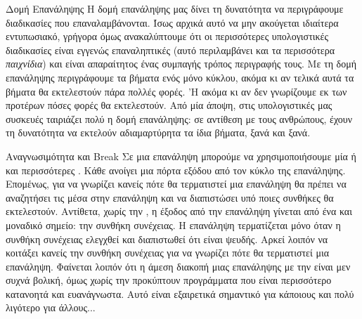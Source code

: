 \documentclass[a4paper,11pt,oneside]{book}
\begin{document}
\begin{theory}{Δομή Επανάληψης}
Η δομή επανάληψης μας δίνει τη δυνατότητα να περιγράφουμε διαδικασίες που επαναλαμβάνονται. Ίσως αρχικά αυτό να μην ακούγεται ιδιαίτερα εντυπωσιακό, γρήγορα όμως ανακαλύπτουμε ότι οι περισσότερες υπολογιστικές διαδικασίες είναι εγγενώς επαναληπτικές (αυτό περιλαμβάνει και τα περισσότερα \emph{παιχνίδια}) και είναι απαραίτητος ένας συμπαγής τρόπος περιγραφής τους. Με τη δομή επανάληψης περιγράφουμε τα βήματα ενός μόνο κύκλου, ακόμα κι αν τελικά αυτά τα βήματα θα εκτελεστούν πάρα πολλές φορές. 'Η ακόμα κι αν δεν γνωρίζουμε εκ των προτέρων πόσες φορές θα εκτελεστούν. Από μία άποψη, στις υπολογιστικές μας συσκευές ταιριάζει πολύ η δομή επανάληψης: σε αντίθεση με τους ανθρώπους, έχουν τη δυνατότητα να εκτελούν αδιαμαρτύρητα τα ίδια βήματα, ξανά και ξανά.
\end{theory}

\begin{theory}{Αναγνωσιμότητα και Break}
Σε μια επανάληψη μπορούμε να χρησιμοποιήσουμε μία ή και περισσότερες . Κάθε  ανοίγει μια πόρτα εξόδου από τον κύκλο της επανάληψης. Επομένως, για να γνωρίζει κανείς πότε θα τερματιστεί μια επανάληψη θα πρέπει να αναζητήσει τις  μέσα στην επανάληψη και να διαπιστώσει υπό ποιες συνθήκες θα εκτελεστούν. Αντίθετα, χωρίς την , η έξοδος από την επανάληψη γίνεται από ένα και μοναδικό σημείο: την συνθήκη συνέχειας. Η επανάληψη τερματίζεται μόνο όταν η συνθήκη συνέχειας ελεγχθεί και διαπιστωθεί ότι είναι ψευδής. Αρκεί λοιπόν να κοιτάξει κανείς την συνθήκη συνέχειας για να γνωρίζει πότε θα τερματιστεί μια επανάληψη. Φαίνεται λοιπόν ότι η άμεση διακοπή μιας επανάληψης με την  είναι μεν συχνά βολική, όμως χωρίς την  προκύπτουν προγράμματα που είναι περισσότερο κατανοητά και ευανάγνωστα. Αυτό είναι εξαιρετικά σημαντικό για κάποιους και πολύ λιγότερο για άλλους...
\end{theory}
\end{document}
